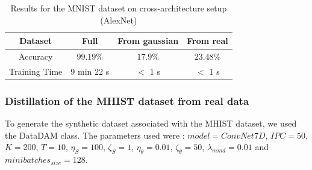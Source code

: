 \documentclass[onecolumn]{IEEEtran}
\begin{document}
\begin{table}[H]
    \centering
    \begin{tabular}{|c|c|c|c|}
        \hline
        Dataset & Full & From gaussian & From real \\
        \hline
        Accuracy & $99.19\%$ & $17.9\%$ & $23.48\%$ \\
        \hline
        Training Time & 9 min 22 s & $<$ 1 s & $<$ 1 s \\
        \hline
    \end{tabular}
    \caption{Results for the MNIST dataset on cross-architecture setup (AlexNet)}
    \label{tab:MNIST_results_cross_architecture}
\end{table}

\subsubsection{Distillation of the MHIST dataset from real data}
To generate the synthetic dataset associated with the MHIST dataset, we used the DataDAM class. The parameters used were : $model = ConvNet7D$, $IPC = 50$, $K=200$, $T=10$, $\eta_S = 100$, $\zeta_S = 1$, $\eta_\theta = 0.01$, $\zeta_\theta=50$, $\lambda_{mmd}=0.01$ and $minibatches_{size}=128$.
\end{document}
